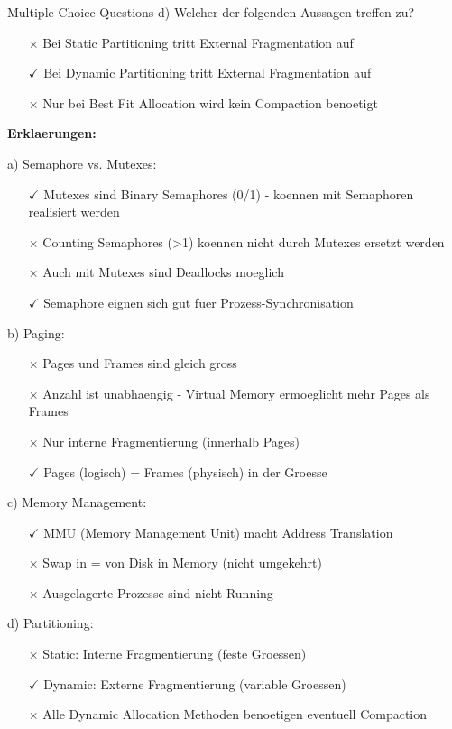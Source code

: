 \begin{example2}{Multiple Choice Questions}
    d) Welcher der folgenden Aussagen treffen zu?
    \begin{itemize}
        \item[$\times$] Bei Static Partitioning tritt External Fragmentation auf
        \item[$\checkmark$] Bei Dynamic Partitioning tritt External Fragmentation auf  
        \item[$\times$] Nur bei Best Fit Allocation wird kein Compaction benoetigt
    \end{itemize}
    
    \tcblower
    
    \textbf{Erklaerungen:}
    
    a) Semaphore vs. Mutexes:
    \begin{itemize}
        \item[$\checkmark$] Mutexes sind Binary Semaphores (0/1) - koennen mit Semaphoren realisiert werden
        \item[$\times$] Counting Semaphores (>1) koennen nicht durch Mutexes ersetzt werden
        \item[$\times$] Auch mit Mutexes sind Deadlocks moeglich
        \item[$\checkmark$] Semaphore eignen sich gut fuer Prozess-Synchronisation
    \end{itemize}
    
    b) Paging:
    \begin{itemize}
        \item[$\times$] Pages und Frames sind gleich gross
        \item[$\times$] Anzahl ist unabhaengig - Virtual Memory ermoeglicht mehr Pages als Frames
        \item[$\times$] Nur interne Fragmentierung (innerhalb Pages)
        \item[$\checkmark$] Pages (logisch) = Frames (physisch) in der Groesse
    \end{itemize}
    
    c) Memory Management:
    \begin{itemize}
        \item[$\checkmark$] MMU (Memory Management Unit) macht Address Translation
        \item[$\times$] Swap in = von Disk in Memory (nicht umgekehrt)
        \item[$\times$] Ausgelagerte Prozesse sind nicht Running
    \end{itemize}
    
    d) Partitioning:
    \begin{itemize}
        \item[$\times$] Static: Interne Fragmentierung (feste Groessen)
        \item[$\checkmark$] Dynamic: Externe Fragmentierung (variable Groessen)
        \item[$\times$] Alle Dynamic Allocation Methoden benoetigen eventuell Compaction
    \end{itemize}
\end{example2}


